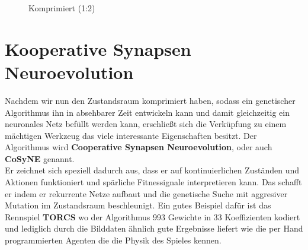 \begin{multicols}{2}
\begin{figure}[H]
\begin{center}
                        \caption{Komprimiert (1:2)}\label{fig:dct-after}
                    \end{center}
                \end{figure}
            \end{multicols}

    \section{Kooperative Synapsen Neuroevolution}
        Nachdem wir nun den Zustandsraum komprimiert haben, sodass ein genetischer Algorithmus ihn in absehbarer Zeit entwickeln kann und damit gleichzeitig ein neuronales Netz befüllt werden kann, erschließt sich die Verküpfung zu einem mächtigen Werkzeug das viele interessante Eigenschaften besitzt. Der Algorithmus wird \textbf{Cooperative Synapsen Neuroevolution}\cite{cosyne2}, oder auch \textbf{CoSyNE} genannt.\\

        \noindent
        Er zeichnet sich speziell dadurch aus, dass er auf kontinuierlichen Zuständen und Aktionen funktioniert und spärliche Fitnessignale interpretieren kann. Das schafft er indem er rekurrente Netze aufbaut und die genetische Suche mit aggresiver Mutation im Zustandsraum beschleunigt. Ein gutes Beispiel dafür ist das Rennspiel \textbf{TORCS}\cite{cosyne3} wo der Algorithmus 993 Gewichte in 33 Koeffizienten kodiert und lediglich durch die Bilddaten ähnlich gute Ergebnisse liefert wie die per Hand programmierten Agenten die die Physik des Spieles kennen.\\

